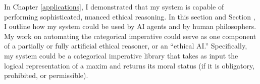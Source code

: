 %
\begin{isabellebody}%
%
%
\isadelimtheory
%
\endisadelimtheory
%
\isatagtheory
%
\endisatagtheory
{\isafoldtheory}%
%
\isadelimtheory
%
\endisadelimtheory
%
\isadelimdocument
%
\endisadelimdocument
%
\isatagdocument
%
\isamarkuptrue%
%
\isamarkuptrue%
%
\endisatagdocument
{\isafolddocument}%
%
\isadelimdocument
%
\endisadelimdocument
%
\begin{isamarkuptext}%
In Chapter \ref{applications}, I demonstrated that my system is capable of performing sophisticated,
nuanced ethical reasoning. In this section and Section \label{computationalethics}, I outline how my
system could be used by AI agents and by human philosophers. My work on automating the categorical imperative 
could serve as one component of a partially or fully artificial ethical reasoner, or an ``ethical AI.''
Specifically, my system could be a categorical imperative library that takes as input the logical representation 
of a maxim and returns its moral status (if it is obligatory, prohibited, or permissible).


\end{isamarkuptext}
\end{isabellebody}
